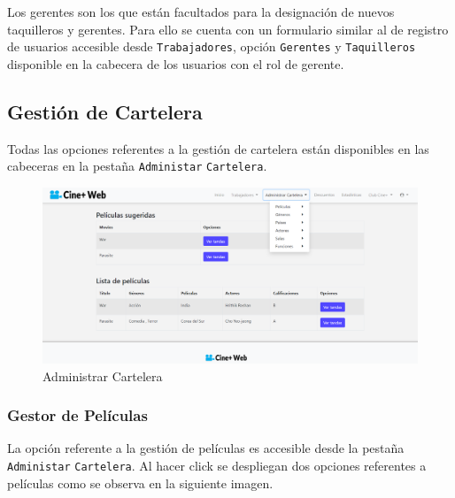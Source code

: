 Los gerentes son los que est\'an facultados para la designación de nuevos taquilleros y gerentes. Para ello se cuenta con un formulario similar al de registro de usuarios accesible desde \verb|Trabajadores|, opci\'on \verb|Gerentes| y \verb|Taquilleros| disponible en la cabecera de los usuarios con el rol de gerente.

\subsection{Gestión de Cartelera}

Todas las opciones referentes a la gestión de cartelera est\'an disponibles en las cabeceras en la pesta\~na \verb*|Administar| \verb*|Cartelera|.\\

\begin{figure}[h!]
	\centering
	\includegraphics[scale=0.35]{./chapters/img/cartelera.png}
	
	\label{fig:cartelera}
	\caption{Administrar Cartelera}
	
\end{figure}

\subsubsection{Gestor de Pel\'iculas}
La opci\'on referente a la gesti\'on de pel\'iculas es accesible desde la pesta\~na \verb*|Administar| \verb*|Cartelera|. Al hacer click se despliegan dos opciones referentes a pel\'iculas como se observa en la siguiente imagen.

